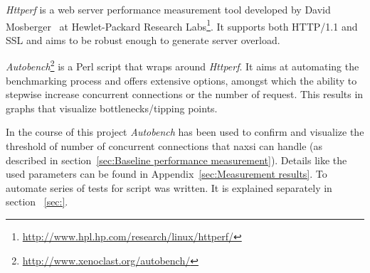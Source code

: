 \emph{Httperf} is a web server performance measurement tool developed by David Mosberger~\cite{mosberger1998httperf} at Hewlet-Packard Research Labs\footnote{\url{http://www.hpl.hp.com/research/linux/httperf/}}. It supports both HTTP/1.1 and SSL and aims to be robust enough to generate server overload.

\emph{Autobench}\footnote{\url{http://www.xenoclast.org/autobench/}} is a Perl script that wraps around \emph{Httperf}. It aims at automating the benchmarking process and offers extensive options, amongst which the ability to stepwise increase concurrent connections or the number of request. This results in graphs that visualize bottlenecks/tipping points.

In the course of this project \emph{Autobench} has been used to confirm and visualize the threshold of number of concurrent connections that naxsi can handle (as described in section~\ref{sec:Baseline performance measurement}). Details like the used parameters can be found in Appendix~\ref{sec:Measurement results}. To automate series of tests for script was written. It is explained separately in section {\color{red}{(PLEASE ADD REFERENCE)}}~\ref{sec:}.
